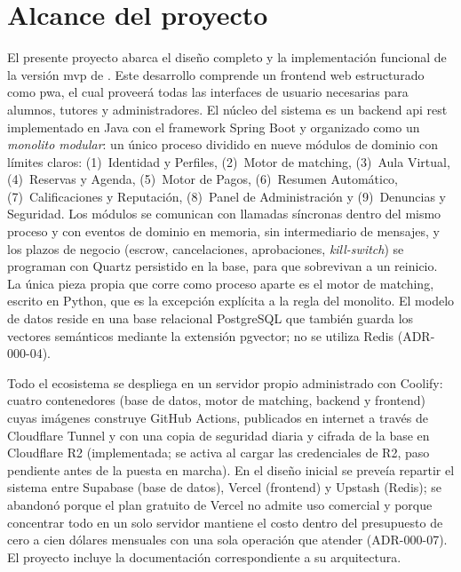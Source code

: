 \section{Alcance del proyecto}\label{sec:alcance}

El presente proyecto abarca el diseño completo y la implementación
funcional de la versión \gls{mvp} de \sistema{}. Este desarrollo
comprende un frontend web estructurado como \gls{pwa}, el cual proveerá
todas las interfaces de usuario necesarias para alumnos, tutores y
administradores. El núcleo del sistema es un backend \gls{api}
\gls{rest} implementado en Java con el framework Spring Boot y
organizado como un \emph{monolito modular}: un único proceso dividido
en nueve módulos de dominio con límites claros: (1)~Identidad y
Perfiles, (2)~Motor de \gls{matching}, (3)~Aula Virtual, (4)~Reservas y
Agenda, (5)~Motor de Pagos, (6)~Resumen Automático, (7)~Calificaciones
y Reputación, (8)~Panel de Administración y (9)~Denuncias y Seguridad.
Los módulos se comunican con llamadas síncronas dentro del mismo
proceso y con eventos de dominio en memoria, sin intermediario de
mensajes, y los plazos de negocio (\gls{escrow}, cancelaciones,
aprobaciones, \emph{kill-switch}) se programan con Quartz persistido en
la base, para que sobrevivan a un reinicio. La única pieza propia que
corre como proceso aparte es el motor de \gls{matching}, escrito en
Python, que es la excepción explícita a la regla del monolito. El modelo
de datos reside en una base relacional PostgreSQL que también guarda
los vectores semánticos mediante la extensión pgvector; no se utiliza
Redis (ADR-000-04).

Todo el ecosistema se despliega en un servidor propio administrado con
Coolify: cuatro contenedores (base de datos, motor de \gls{matching},
backend y frontend) cuyas imágenes construye GitHub Actions, publicados
en internet a través de Cloudflare Tunnel y con una copia de seguridad
diaria y cifrada de la base en Cloudflare R2 (implementada; se activa al
cargar las credenciales de R2, paso pendiente antes de la puesta en marcha). En el diseño inicial se
preveía repartir el sistema entre Supabase (base de datos), Vercel
(frontend) y Upstash (Redis); se abandonó porque el plan gratuito de
Vercel no admite uso comercial y porque concentrar todo en un solo
servidor mantiene el costo dentro del presupuesto de cero a cien
dólares mensuales con una sola operación que atender (ADR-000-07). El
proyecto incluye la documentación correspondiente a su arquitectura.

